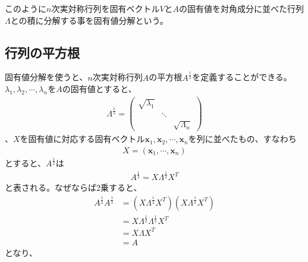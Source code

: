 このように$n$次実対称行列を固有ベクトル$V$と$A$の固有値を対角成分に並べた行列$\Lambda$との積に分解する事を固有値分解という。
\subsection{行列の平方根}
固有値分解を使うと、$n$次実対称行列$A$の平方根$\displaystyle{A^{\frac{1}{2}}}$を定義することができる。$\lambda_1, \lambda_2, \cdots, \lambda_n$を$A$の固有値とすると、
\begin{align*}
  \Lambda^{\frac{1}{2}} = \left(
                            \begin{array}{ccc}
                              \sqrt{\lambda_1} &        & \\
                                               & \ddots & \\
                                               &        & \sqrt{\Lambda_n}
                            \end{array}
                          \right)
\end{align*}
、$X$を固有値に対応する固有ベクトル$\mathbf{x}_1, \mathbf{x}_2, \cdots, \mathbf{x}_n$を列に並べたもの、すなわち
\begin{align*}
  X = \left(\mathbf{x}_1, \cdots, \mathbf{x}_n\right)
\end{align*}
とすると、$A^\frac{1}{2}$は
\begin{align*}
  A^\frac{1}{2} = X \Lambda^{\frac{1}{2}} X^T
\end{align*}
と表される。なぜならば2乗すると、
\begin{align*}
  A^{\frac{1}{2}} A^{\frac{1}{2}} & = \left(X \Lambda^{\frac{1}{2}} X^T\right) \left(X \Lambda^{\frac{1}{2}} X^T\right) \\
                                  & = X \Lambda^{\frac{1}{2}} \Lambda^{\frac{1}{2}} X^T \\
                                  & = X \Lambda X^T \\
                                  & = A
\end{align*}
となり、
